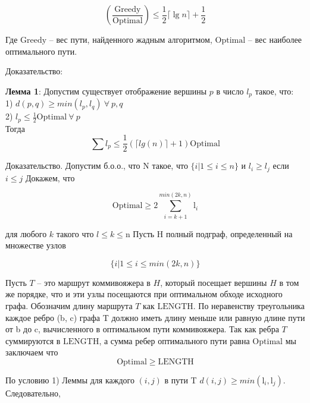 \documentclass[a4paper, 14pt]{extarticle}
\numberwithin{equation}{section}
\begin{document}
\begin{equation}
	(\frac{\mathrm{Greedy}}{\mathrm{Optimal}}) \leqslant \frac{1}{2}\lceil{\lg n}\rceil + \frac{1}{2}
\end{equation}

Где $\mathrm{Greedy}$ -- вес пути, найденного жадным алгоритмом, $\mathrm{Optimal}$ -- вес наиболее оптимального пути.

Доказательство:

\textbf{Лемма 1}: Допустим существует отображение вершины $p$ в число $l_p$ такое, что:\\
1) $d(p,q) \geqslant min(l_p, l_q) \: \forall \: p,q$\\
2) $l_p \leqslant \frac{1}{2}\mathrm{Optimal}\: \forall \: p $\\
Тогда 
\begin{equation}
\sum l_p \leqslant \frac{1}{2}(\lceil lg(n)\rceil+1)\mathrm{Optimal}
\end{equation}

Доказательство.
Допустим б.о.о., что N такое, что  $\{i|1 \leqslant i \leqslant n \}$  и $l_i \geqslant l_j$ если $i \leqslant j$
Докажем, что 

\begin{equation}\label{metriclowerbound}
	{\mathrm{Optimal}} \geqslant 2\sum_{i=k+1}^{min(2k,n)}\mathrm{l}_i
\end{equation}

для любого $k$ такого что $l \leqslant k \leqslant $n
Пусть H полный подграф, определенный на множестве узлов

\begin{equation}
	{\{i|1 \leqslant i \leqslant min(2k, n)\}}
\end{equation}

Пусть $T$ -- это маршрут коммивояжера в $H$, который посещает вершины $H$ в том же порядке, что и эти узлы посещаются при оптимальном обходе исходного графа. Обозначим длину маршрута $T$ как $\mathrm{LENGTH}$. По неравенству треугольника каждое ребро (b, c) графа T должно иметь длину меньше или равную длине пути от b до c, вычисленного в оптимальном пути коммивояжера. Так как ребра $T$ суммируются в $\mathrm{LENGTH}$, а сумма ребер оптимального пути равна $\mathrm{Optimal}$ мы заключаем что
\begin{equation}
	{\mathrm{Optimal}} \geqslant {\mathrm{LENGTH}}
\end{equation}

По условию 1) Леммы для каждого $(i, j)$ в пути T  $d (i, j)\geqslant min (\mathrm{l}_i, \mathrm{l}_j)$. Следовательно,
\end{document}

